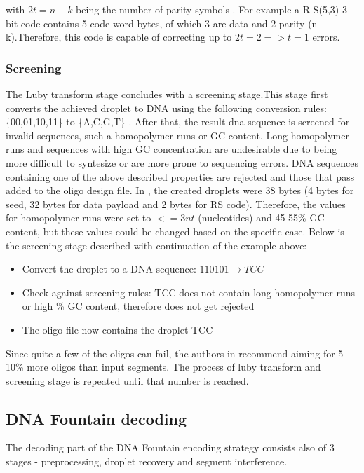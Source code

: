\documentclass[12pt]%
{article}
\begin{document}
with $2t = n - k$ being the number of parity symbols \cite{sklar2001reed}. For example a R-S(5,3) 3-bit code  contains 5 code word bytes, of which 3 are data and 2 parity (n-k).Therefore, this code is capable of correcting up to $2t=2   => t = 1$ errors.


\subsubsection{Screening}
The Luby transform stage concludes with a screening stage.This stage first converts the achieved droplet to DNA using the following conversion rules: \{00,01,10,11\} to \{A,C,G,T\} \cite{erlich2017dnasupplementary}. After that, the result dna sequence is screened for invalid sequences, such a homopolymer runs or GC content. Long homopolymer runs and sequences with high GC concentration are undesirable \cite{erlich2017dna} due to being more difficult to syntesize or are more prone to sequencing errors. DNA sequences containing one of the above described properties are rejected and those that pass added to the oligo design file. In \cite{erlich2017dna}, the created droplets were 38 bytes (4 bytes for seed, 32 bytes for data payload and 2 bytes for RS code). Therefore, the values for homopolymer runs were set to \(<= 3 nt \) (nucleotides) and 45-55\% GC content, but these values could be changed based on the specific case. Below is the screening stage described with continuation of the example above:

\begin{itemize}
\item Convert the droplet to a DNA sequence: $110101 \rightarrow TCC$
\item Check against screening rules: TCC does not contain long homopolymer runs or high \% GC content, therefore does not get rejected
\item The oligo file now contains the droplet TCC
\end{itemize}

Since quite a few of the oligos can fail, the authors in \cite{erlich2017dna} recommend aiming for 5-10\% more oligos than input segments. The process of luby transform and screening stage is repeated until that number is reached. 

\newpage
\subsection{DNA Fountain decoding}

The decoding part of the DNA Fountain encoding strategy consists also of 3 stages - preprocessing, droplet recovery and segment interference.
\end{document}
